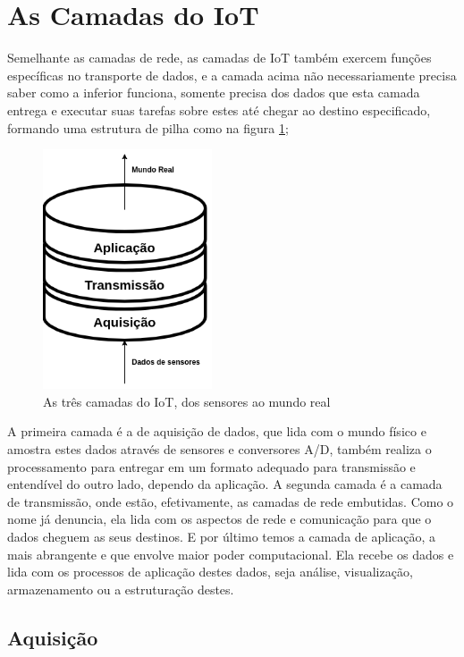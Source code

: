 \section{As Camadas do IoT}
\label{section:camadas_iot}

Semelhante as camadas de rede, as camadas de IoT também exercem funções específicas no transporte de dados, e a camada acima não necessariamente precisa saber como a inferior funciona, somente precisa dos dados que esta camada entrega e executar suas tarefas sobre estes até chegar ao destino especificado, formando uma estrutura de pilha como na figura \ref{fig:1.1.0/camadas_iot};

\begin{figure}[h!]
\centering
\includegraphics[width=5cm]{./02_Capitulos/02_Cap1/figures/iot_stack}
\caption{As três camadas do IoT, dos sensores ao mundo real}
\label{fig:1.1.0/camadas_iot}
\end{figure}

A primeira camada é a de aquisição de dados, que lida com o mundo físico e amostra estes dados através de sensores e conversores A/D, também realiza o processamento para entregar em um formato adequado para transmissão e entendível do outro lado, dependo da aplicação. A segunda camada é a camada de transmissão, onde estão, efetivamente, as camadas de rede embutidas. Como o nome já denuncia, ela lida com os aspectos de rede e comunicação para que o dados cheguem as seus destinos. E por último temos a camada de aplicação, a mais abrangente e que envolve maior poder computacional. Ela recebe os dados e lida com os processos de aplicação destes dados, seja análise, visualização, armazenamento ou a estruturação destes.

\subsection{Aquisição}
\label{subsection:aquisicao}

